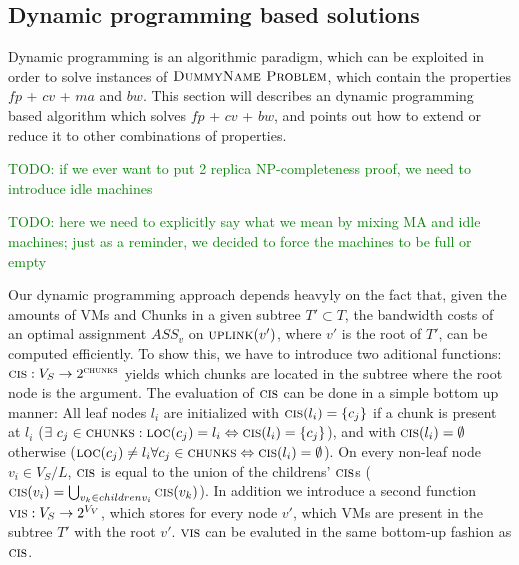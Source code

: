 \documentclass[9pt,twocolumn]{scrartcl}
\newcommand{\Chunk}{\ensuremath{c}}
\newcommand{\Problem}{\textsc{DummyName Problem}}
\newcommand{\maciek}[1]{\textcolor{green}{#1}}
\newcommand{\VmChunkAssignment}{\ensuremath{ASS_v}}
\newcommand{\ChunkLocation}{\ensuremath{\textsc{loc}}}
\newcommand{\VirtualNodes}{\ensuremath{V_V}}
\newcommand{\SubstrateNodes}{\ensuremath{V_S}}
\newcommand{\SubstrateNode}{\ensuremath{v}}
\newcommand{\Leaf}{\ensuremath{l}}
\newcommand{\Leaves}{\ensuremath{L}}
\newcommand{\Chunks}{\ensuremath{\textsc{chunks}}}
\newcommand{\Cost}{\textsc{Cost}}
\newcommand{\Tree}{\ensuremath{T}}
\begin{document}
\subsection{Dynamic programming based solutions}

Dynamic programming is an algorithmic paradigm, which can be exploited in
order to solve instances of $\Problem$, which contain the properties $fp$ +
$cv$ + $ma$ and $bw$. This section will describes an dynamic programming based
algorithm which solves $fp$ + $cv$ + $bw$, and points out how to extend or
reduce it to other combinations of properties.

\maciek{TODO: if we ever want to put 2 replica NP-completeness proof, we need
to introduce idle machines}

\maciek{TODO: here we need to explicitly say what we mean by mixing MA and idle
machines; just as a reminder, we decided to force the machines to be full or
empty}


\newcommand{\Opt}{\ensuremath{Opt}}
\newcommand{\Children}{\ensuremath{children}}

\newcommand{\Uplink}{\ensuremath{\textsc{uplink}}}
\newcommand{\ChunkCount}{\ensuremath{\textsc{cis}}}
\newcommand{\VmCount}{\ensuremath{\textsc{vis}}}
\newcommand{\Right}{\ensuremath{r}}
\newcommand{\InverseAssignment}{\ensuremath{\VmChunkAssignment^{-1}}}

Our dynamic programming approach depends heavyly on the fact that, given the
amounts of VMs and Chunks in a given subtree $\Tree' \subset \Tree$, the
bandwidth costs of an optimal assignment $\VmChunkAssignment$ on
$\Uplink(\SubstrateNode')$, where $\SubstrateNode'$ is the root of $\Tree'$,
can be computed efficiently. To show this, we have to introduce two aditional
functions: $\ChunkCount : \SubstrateNodes
\rightarrow
2^\Chunks$ yields which chunks are located in the subtree where the root node
is the argument. The evaluation of $\ChunkCount$ can be done in a
simple bottom
up manner: All leaf nodes $\Leaf_i$ are initialized with $\ChunkCount(\Leaf_i)
= \{\Chunk_j\}$ if a chunk is present at $\Leaf_i$ ($\exists ~ \Chunk_j \in
\Chunks : \ChunkLocation(\Chunk_j) = \Leaf_i \Leftrightarrow
\ChunkCount(\Leaf_i) = \{\Chunk_j\}$), and with $\ChunkCount(\Leaf_i) =
\emptyset$ otherwise ($\ChunkLocation(\Chunk_j) \neq \Leaf_i \forall \Chunk_j
\in
\Chunks \Leftrightarrow \ChunkCount(\Leaf_i) = \emptyset$). On every non-leaf
node $\SubstrateNode_i \in \SubstrateNodes / \Leaves$, $\ChunkCount$ is equal
to the union of the childrens' $\ChunkCount$s
($\ChunkCount(\SubstrateNode_i)
= \bigcup_{\SubstrateNode_k \in \Children{\SubstrateNode_i}}
\ChunkCount(\SubstrateNode_k)$). In addition we introduce a second function
$\VmCount : \SubstrateNodes \rightarrow 2^{\VirtualNodes}$, which stores for
every node $\SubstrateNode'$, which VMs are present in the subtree $\Tree'$
with the root $\SubstrateNode'$. $\VmCount$ can be evaluted in the
same bottom-up fashion as $\ChunkCount$.
\end{document}
